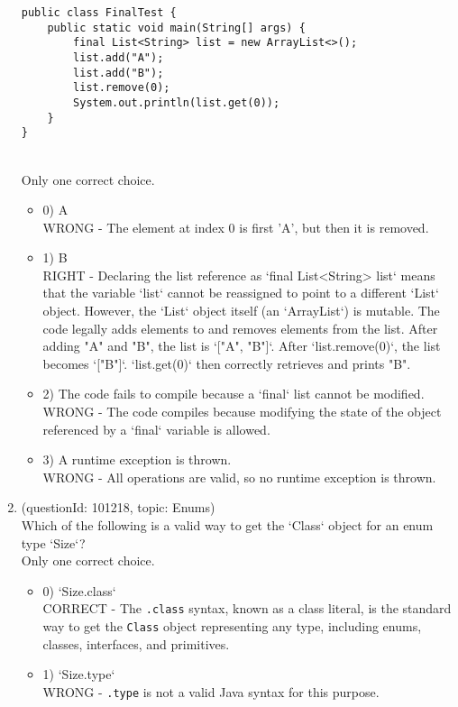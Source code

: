 \documentclass[12pt]{article}
\begin{document}
\begin{enumerate}[label=(\arabic*)]
\begin{verbatim}
public class FinalTest {
    public static void main(String[] args) {
        final List<String> list = new ArrayList<>();
        list.add("A");
        list.add("B");
        list.remove(0);
        System.out.println(list.get(0));
    }
}
\end{verbatim}
\\ \noindent Only one correct choice. 
\begin{itemize}
\item 0) A
 \\ 
WRONG - The element at index 0 is first 'A', but then it is removed.

\item 1) B
 \\ 
RIGHT - Declaring the list reference as `final List<String> list` means that the variable `list` cannot be reassigned to point to a different `List` object. However, the `List` object itself (an `ArrayList`) is mutable. The code legally adds elements to and removes elements from the list. After adding "A" and "B", the list is `["A", "B"]`. After `list.remove(0)`, the list becomes `["B"]`. `list.get(0)` then correctly retrieves and prints "B".

\item 2) The code fails to compile because a `final` list cannot be modified.
 \\ 
WRONG - The code compiles because modifying the state of the object referenced by a `final` variable is allowed.

\item 3) A runtime exception is thrown.
 \\ 
WRONG - All operations are valid, so no runtime exception is thrown.

\end{itemize}
\item (questionId: 101218, topic: Enums) \\ 
Which of the following is a valid way to get the `Class` object for an enum type `Size`?
\\ \noindent Only one correct choice. 
\begin{itemize}
\item 0) `Size.class`
 \\ 
CORRECT - The \verb|.class| syntax, known as a class literal, is the standard way to get the \verb|Class| object representing any type, including enums, classes, interfaces, and primitives.

\item 1) `Size.type`
 \\ 
WRONG - \verb|.type| is not a valid Java syntax for this purpose.


\end{itemize}
\end{enumerate}
\end{document}
